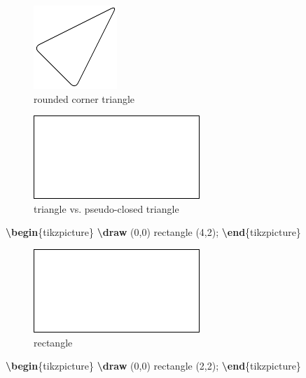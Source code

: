\documentclass[
]{book}
\newenvironment{Shaded}{\begin{snugshade}}{\end{snugshade}}
\newcommand{\ExtensionTok}[1]{#1}
\newcommand{\FunctionTok}[1]{\textcolor[rgb]{0.13,0.29,0.53}{\textbf{#1}}}
\newcommand{\KeywordTok}[1]{\textcolor[rgb]{0.13,0.29,0.53}{\textbf{#1}}}
\newcommand{\NormalTok}[1]{#1}
\theoremstyle{definition}
\theoremstyle{definition}
\theoremstyle{definition}
\theoremstyle{definition}
\theoremstyle{remark}
\begin{document}
\begin{figure}
\includegraphics[width=0.25\linewidth]{202401311000-TikZ_files/figure-latex/unnamed-chunk-17-1} \caption{rounded corner triangle}\label{fig:unnamed-chunk-17}
\end{figure}

\begin{figure}
\includegraphics[width=0.25\linewidth]{202401311000-TikZ_files/figure-latex/unnamed-chunk-18-1} \caption{triangle vs. pseudo-closed triangle}\label{fig:unnamed-chunk-18}
\end{figure}

\begin{Shaded}
\begin{Highlighting}[]
\KeywordTok{\textbackslash{}begin}\NormalTok{\{}\ExtensionTok{tikzpicture}\NormalTok{\}}
  \FunctionTok{\textbackslash{}draw}\NormalTok{ (0,0) rectangle (4,2);}
\KeywordTok{\textbackslash{}end}\NormalTok{\{}\ExtensionTok{tikzpicture}\NormalTok{\}}
\end{Highlighting}
\end{Shaded}

\begin{figure}
\includegraphics[width=0.25\linewidth]{202401311000-TikZ_files/figure-latex/unnamed-chunk-20-1} \caption{rectangle}\label{fig:unnamed-chunk-20}
\end{figure}

\begin{Shaded}
\begin{Highlighting}[]
\KeywordTok{\textbackslash{}begin}\NormalTok{\{}\ExtensionTok{tikzpicture}\NormalTok{\}}
  \FunctionTok{\textbackslash{}draw}\NormalTok{ (0,0) rectangle (2,2);}
\KeywordTok{\textbackslash{}end}\NormalTok{\{}\ExtensionTok{tikzpicture}\NormalTok{\}}
\end{Highlighting}
\end{Shaded}
\end{document}
